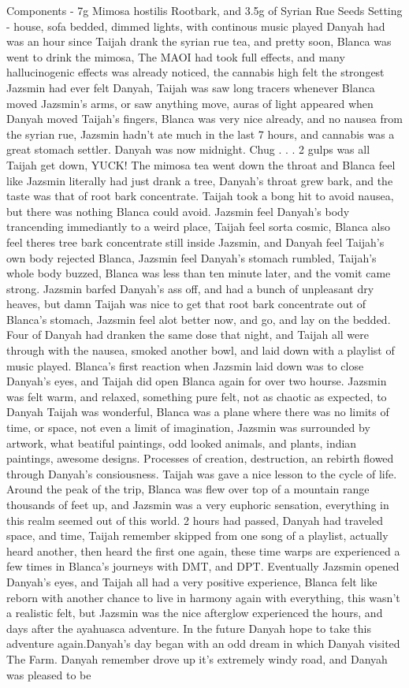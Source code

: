 \documentclass[12pt]{book}
\begin{document}
Components - 7g Mimosa hostilis Rootbark, and 3.5g of Syrian Rue Seeds Setting - house, sofa bedded, dimmed lights, with continous music played Danyah had was an hour since Taijah drank the syrian rue tea, and pretty soon, Blanca was went to drink the mimosa, The MAOI had took full effects, and many hallucinogenic effects was already noticed, the cannabis high felt the strongest Jazsmin had ever felt Danyah, Taijah was saw long tracers whenever Blanca moved Jazsmin's arms, or saw anything move, auras of light appeared when Danyah moved Taijah's fingers, Blanca was very nice already, and no nausea from the syrian rue, Jazsmin hadn't ate much in the last 7 hours, and cannabis was a great stomach settler. Danyah was now midnight. Chug . . .  2 gulps was all Taijah get down, YUCK! The mimosa tea went down the throat and Blanca feel like Jazsmin literally had just drank a tree, Danyah's throat grew bark, and the taste was that of root bark concentrate. Taijah took a bong hit to avoid nausea, but there was nothing Blanca could avoid. Jazsmin feel Danyah's body trancending immediantly to a weird place, Taijah feel sorta cosmic, Blanca also feel theres tree bark concentrate still inside Jazsmin, and Danyah feel Taijah's own body rejected Blanca, Jazsmin feel Danyah's stomach rumbled, Taijah's whole body buzzed, Blanca was less than ten minute later, and the vomit came strong. Jazsmin barfed Danyah's ass off, and had a bunch of unpleasant dry heaves, but damn Taijah was nice to get that root bark concentrate out of Blanca's stomach, Jazsmin feel alot better now, and go, and lay on the bedded. Four of Danyah had dranken the same dose that night, and Taijah all were through with the nausea, smoked another bowl, and laid down with a playlist of music played. Blanca's first reaction when Jazsmin laid down was to close Danyah's eyes, and Taijah did open Blanca again for over two hourse. Jazsmin was felt warm, and relaxed, something pure felt, not as chaotic as expected, to Danyah Taijah was wonderful, Blanca was a plane where there was no limits of time, or space, not even a limit of imagination, Jazsmin was surrounded by artwork, what beatiful paintings, odd looked animals, and plants, indian paintings, awesome designs. Processes of creation, destruction, an rebirth flowed through Danyah's consiousness. Taijah was gave a nice lesson to the cycle of life. Around the peak of the trip, Blanca was flew over top of a mountain range thousands of feet up, and Jazsmin was a very euphoric sensation, everything in this realm seemed out of this world. 2 hours had passed, Danyah had traveled space, and time, Taijah remember skipped from one song of a playlist, actually heard another, then heard the first one again, these time warps are experienced a few times in Blanca's journeys with DMT, and DPT. Eventually Jazsmin opened Danyah's eyes, and Taijah all had a very positive experience, Blanca felt like reborn with another chance to live in harmony again with everything, this wasn't a realistic felt, but Jazsmin was the nice afterglow experienced the hours, and days after the ayahuasca adventure. In the future Danyah hope to take this adventure again.Danyah's day began with an odd dream in which Danyah visited The Farm. Danyah remember drove up it's extremely windy road, and Danyah was pleased to be 
\end{document}
